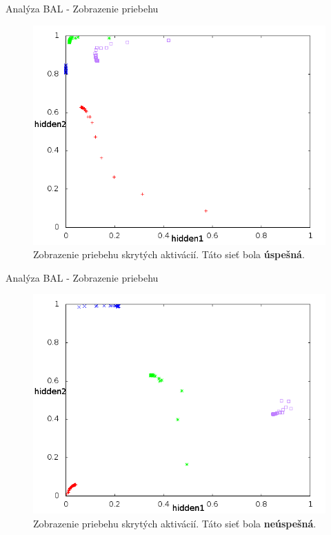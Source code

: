 \documentclass[xcolor=dvipsnames]{beamer}
\begin{document}
\begin{frame}{Analýza BAL - Zobrazenie priebehu}
  \begin{figure}[h!]  
    \centering
    \includegraphics[scale=0.4]{img/left_top.png}
    \caption{{\small Zobrazenie priebehu skrytých aktivácií. Táto sieť bola {\bf úspešná}.} }
  \end{figure} 
\end{frame}

\begin{frame}{Analýza BAL - Zobrazenie priebehu}
  \begin{figure}[h!]  
    \centering
    \includegraphics[scale=0.4]{img/tazisko.png}
    \caption{{\small Zobrazenie priebehu skrytých aktivácií. Táto sieť bola {\bf neúspešná}.} }
  \end{figure} 
\end{frame}
\end{document}
